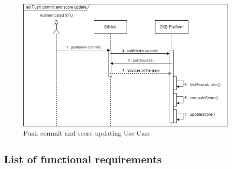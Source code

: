 \begin{figure}[H]
    \centering
    \includegraphics[width=1\textwidth]{images/sequence_diagrams/ClassDiagram-UC18-SequenceDiagram.png}
    \caption{Push commit and score updating Use Case}
    \label{fig:uc18}
\end{figure}

\subsection{List of functional requirements}

